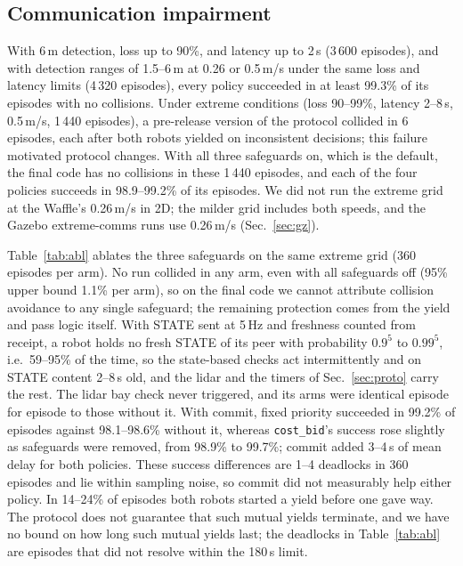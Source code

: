 \documentclass[letterpaper,journal]{IEEEtran}
\newcommand{\cb}{\texttt{cost\_bid}}
\begin{document}
\subsection{Communication impairment}\label{sec:comms}
With 6\,m detection, loss up to 90\%, and latency up to 2\,s (3\,600 episodes), and with detection ranges of 1.5--6\,m at 0.26 or 0.5\,m/s under the same loss and latency limits (4\,320 episodes), every policy succeeded in at least 99.3\% of its episodes with no collisions. Under extreme conditions (loss 90--99\%, latency 2--8\,s, 0.5\,m/s, 1\,440 episodes), a pre-release version of the protocol collided in 6 episodes, each after both robots yielded on inconsistent decisions; this failure motivated protocol changes. With all three safeguards on, which is the default, the final code has no collisions in these 1\,440 episodes, and each of the four policies succeeds in 98.9--99.2\% of its episodes. We did not run the extreme grid at the Waffle's 0.26\,m/s in 2D; the milder grid includes both speeds, and the Gazebo extreme-comms runs use 0.26\,m/s (Sec.~\ref{sec:gz}).

Table~\ref{tab:abl} ablates the three safeguards on the same extreme grid (360 episodes per arm). No run collided in any arm, even with all safeguards off (95\% upper bound 1.1\% per arm), so on the final code we cannot attribute collision avoidance to any single safeguard; the remaining protection comes from the yield and pass logic itself. With STATE sent at 5\,Hz and freshness counted from receipt, a robot holds no fresh STATE of its peer with probability $0.9^5$ to $0.99^5$, i.e.\ 59--95\% of the time, so the state-based checks act intermittently and on STATE content 2--8\,s old, and the lidar and the timers of Sec.~\ref{sec:proto} carry the rest. The lidar bay check never triggered, and its arms were identical episode for episode to those without it. With commit, fixed priority succeeded in 99.2\% of episodes against 98.1--98.6\% without it, whereas \cb's success rose slightly as safeguards were removed, from 98.9\% to 99.7\%; commit added 3--4\,s of mean delay for both policies. These success differences are 1--4 deadlocks in 360 episodes and lie within sampling noise, so commit did not measurably help either policy. In 14--24\% of episodes both robots started a yield before one gave way. The protocol does not guarantee that such mutual yields terminate, and we have no bound on how long such mutual yields last; the deadlocks in Table~\ref{tab:abl} are episodes that did not resolve within the 180\,s limit.
\end{document}
